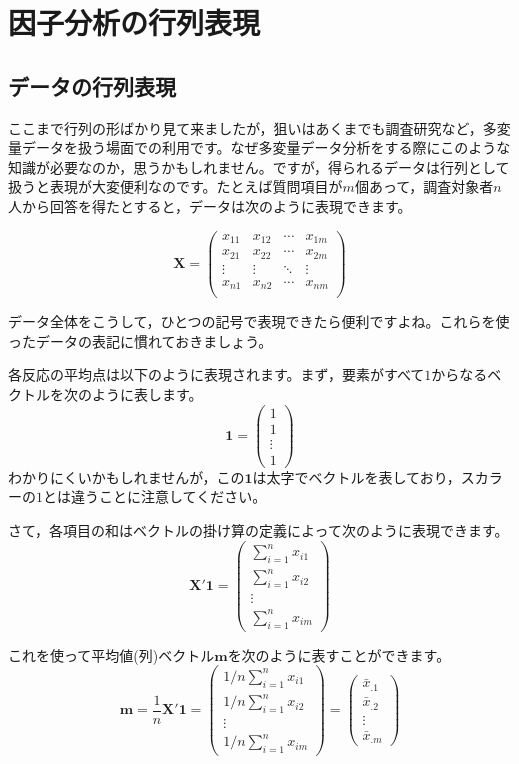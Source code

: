 \documentclass{ltjsbook}
\begin{document}
\chapter{因子分析の行列表現}
\label{H05_MatrixForm}
\section{データの行列表現}

ここまで行列の形ばかり見て来ましたが，狙いはあくまでも調査研究など，多変量データを扱う場面での利用です。なぜ多変量データ分析をする際にこのような知識が必要なのか，思うかもしれません。ですが，得られるデータは行列として扱うと表現が大変便利なのです。たとえば質問項目が$m$個あって，調査対象者$n$人から回答を得たとすると，データは次のように表現できます。

\[
	\bm{X}=
	\begin{pmatrix}
		x_{11} & x_{12} & \cdots & x_{1m} \\
		x_{21} & x_{22} & \cdots & x_{2m} \\
		\vdots & \vdots & \ddots & \vdots \\
		x_{n1} & x_{n2} & \cdots & x_{nm} \\
	\end{pmatrix}
\]

データ全体をこうして，ひとつの記号で表現できたら便利ですよね。これらを使ったデータの表記に慣れておきましょう。

各反応の平均点は以下のように表現されます。まず，要素がすべて$1$からなるベクトルを次のように表します。
\[ \bm{1}=\begin{pmatrix} 1 \\ 1 \\ \vdots \\1 \end{pmatrix} \]
わかりにくいかもしれませんが，この$\bm{1}$は太字でベクトルを表しており，スカラーの$1$とは違うことに注意してください。

さて，各項目の和はベクトルの掛け算の定義によって次のように表現できます。
\[ \bm{X}' \bm{1} = \begin{pmatrix} \sum_{i=1}^{n} x_{i1} \\ \sum_{i=1}^{n} x_{i2} \\ \vdots \\ \sum_{i=1}^{n} x_{im} \end{pmatrix} \]


これを使って平均値(列)ベクトル$\bm{m}$を次のように表すことができます。
\[ \bm{m} = \frac{1}{n} \bm{X}' \bm{1} =
	\begin{pmatrix} 1/n\sum_{i=1}^{n} x_{i1} \\ 1/n\sum_{i=1}^{n} x_{i2} \\ \vdots \\ 1/n\sum_{i=1}^{n} x_{im} \end{pmatrix} =
	\begin{pmatrix}\bar{x}_{.1} \\ \bar{x}_{.2}\\ \vdots \\\bar{x}_{.m} \end{pmatrix} \]
\end{document}
